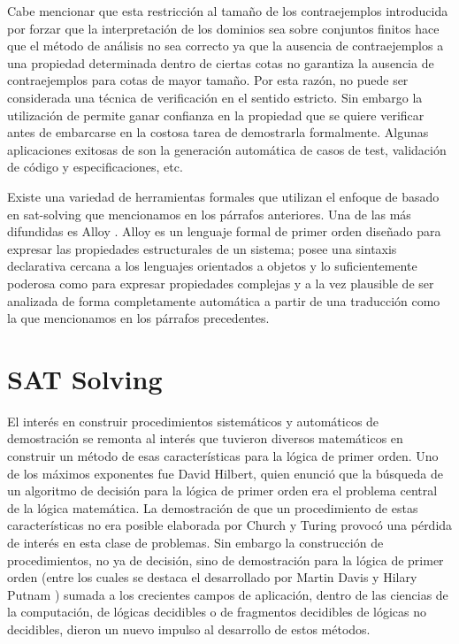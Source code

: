 Cabe mencionar que esta restricción al tamaño de los contraejemplos introducida por forzar que la interpretación de los dominios sea sobre conjuntos finitos hace que el método de análisis no sea correcto ya que la ausencia de contraejemplos a una propiedad determinada dentro de ciertas cotas no garantiza la ausencia de contraejemplos para cotas de mayor tamaño. Por esta razón, \bmc no puede ser considerada una técnica de verificación en el sentido estricto. Sin embargo la utilización de \bmc permite ganar confianza en la propiedad que se quiere verificar antes de embarcarse en la costosa tarea de demostrarla formalmente. Algunas aplicaciones exitosas de \bmc son la generación automática de casos de test, validación de código y especificaciones, etc.

Existe una variedad de herramientas formales que utilizan el enfoque de \bmc basado en sat-solving que mencionamos en los párrafos anteriores. Una de las más difundidas es Alloy \cite{jackson:acmtosem-11_2}. Alloy es un lenguaje formal de primer orden diseñado para expresar las propiedades estructurales de un sistema; posee una sintaxis declarativa cercana a los lenguajes orientados a objetos y lo suficientemente poderosa como para expresar propiedades complejas y a la vez plausible de ser analizada de forma completamente automática a partir de una traducción como la que mencionamos en los párrafos precedentes.


\section{SAT Solving}

El interés en construir procedimientos sistemáticos y automáticos de
demostración se remonta al interés que tuvieron diversos matemáticos en
construir un método de esas características para la lógica de primer orden.
Uno de los máximos exponentes fue David Hilbert, quien enunció que la búsqueda
de un algoritmo de decisión para la lógica de primer orden era el problema
central de la lógica matemática. La demostración de que un procedimiento de
estas características no era posible elaborada por Church y Turing provocó una
pérdida de interés en esta clase de problemas. Sin embargo la construcción de
procedimientos, no ya de decisión, sino de demostración para la lógica de
primer orden (entre los cuales se destaca el desarrollado por Martin Davis y
Hilary Putnam \cite{Davis:1960:CPQ:321033.321034}) sumada a los crecientes
campos de aplicación, dentro de las ciencias de la computación, de lógicas
decidibles o de fragmentos decidibles de lógicas no decidibles, dieron un
nuevo impulso al desarrollo de estos métodos.

